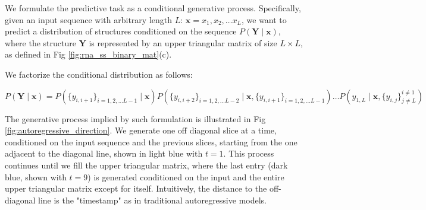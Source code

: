 \documentclass{article}
\begin{document}
We formulate the predictive task as a conditional generative process.
Specifically, given an input sequence with arbitrary length $L$: $\bm{x} = x_1, x_2, \dots x_{L}$,
we want to predict a distribution of structures conditioned on the sequence $P(\bm{Y} \mid \bm{x})$,
where the structure $\bm{Y}$ is represented by an upper triangular matrix of size $L \times L$, as defined in Fig \ref{fig:rna_ss_binary_mat}(c).


We factorize the conditional distribution as follows:

\begin{equation} \label{eq:conditional_distribution}
P(\bm{Y} \mid \bm{x}) = P(\{y_{i, i+1}\}_{i=1, 2, \dots L-1} \mid \bm{x})
P(\{y_{i, i+2}\}_{i=1, 2, \dots L-2} \mid \bm{x}, \{y_{i, i+1}\}_{i=1, 2, \dots L-1})
\dots
P(y_{1, L} \mid \bm{x}, \{y_{i, j}\}^{i \neq 1}_{j \neq L})
\end{equation}


The generative process implied by such formulation is illustrated in Fig \ref{fig:autoregressive_direction}.
We generate one off diagonal slice at a time, conditioned on the input sequence and the previous slices,
starting from the one adjacent to the diagonal line, shown in light blue with $t=1$.
This process continues until we fill the upper triangular matrix,
where the last entry (dark blue, shown with $t=9$) is generated conditioned on the input and the entire upper triangular matrix except for itself.
Intuitively, the distance to the off-diagonal line is the "timestamp" as in traditional autoregressive models.

%
%
\end{document}
